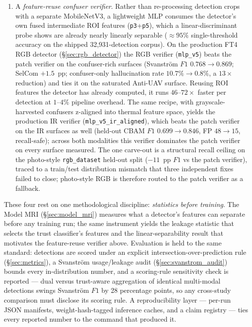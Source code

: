 \begin{enumerate}
    \item A \emph{feature-reuse confuser verifier}. Rather than re-processing detection crops with a separate MobileNetV3, a lightweight MLP consumes the detector's own fused intermediate ROI features (\texttt{p3}+\texttt{p5}), which a linear-discriminant probe shows are already nearly linearly separable ($\approx 95\%$ single-threshold accuracy on the shipped 32{,}931-detection corpus). On the production FT4 RGB detector (\S\ref{sec:rgb_detector}) the RGB verifier (\texttt{mlp\_v5}) beats the patch verifier on the confuser-rich surfaces (Svanstr\"om $F1$ $0.768\to0.869$; SelCom $+1.5$~pp; confuser-only hallucination rate $10.7\%\to0.8\%$, a $13\times$ reduction) and ties it on the saturated Anti-UAV surface. Reusing ROI features the detector has already computed, it runs $46$--$72\times$ faster per detection at $1$--$4\%$ pipeline overhead. The same recipe, with grayscale-harvested confusers z-aligned into thermal feature space, yields the production IR verifier (\texttt{mlp\_v5\_ir\_aligned}), which beats the patch verifier on the IR surfaces as well (held-out CBAM $F1$ $0.699\to0.846$, FP $48\to15$, recall-safe); across both modalities this verifier dominates the patch verifier on every surface measured. The one carve-out is a structural recall ceiling on the photo-style \texttt{rgb\_dataset} held-out split ($-11$~pp $F1$ vs the patch verifier), traced to a train/test distribution mismatch that three independent fixes failed to close; photo-style RGB is therefore routed to the patch verifier as a fallback.
\end{enumerate}

These four rest on one methodological discipline: \emph{statistics before training}. The Model MRI (\S\ref{sec:model_mri}) measures what a detector's features can separate before any training run; the same instrument yields the leakage statistic that selects the trust classifier's features and the linear-separability result that motivates the feature-reuse verifier above. Evaluation is held to the same standard: detections are scored under an explicit intersection-over-prediction rule (\S\ref{sec:metrics}), a Svanstr\"om usage/leakage audit (\S\ref{sec:svanstrom_audit}) bounds every in-distribution number, and a scoring-rule sensitivity check is reported --- dual versus trust-aware aggregation of identical multi-modal detections swings Svanstr\"om $F1$ by 28 percentage points, so any cross-study comparison must disclose its scoring rule. A reproducibility layer --- per-run JSON manifests, weight-hash-tagged inference caches, and a claim registry --- ties every reported number to the command that produced it.

